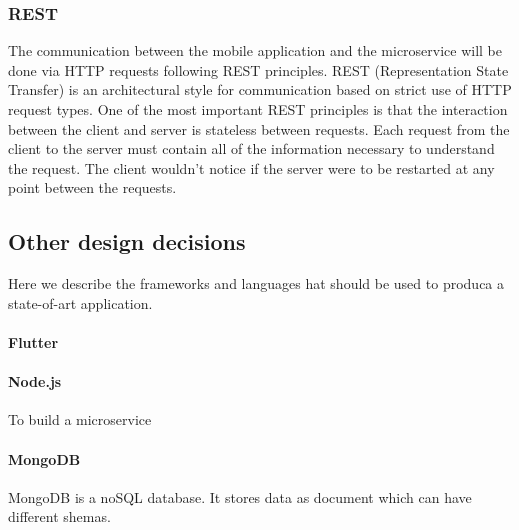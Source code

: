 \subsubsection{REST}

The communication between the mobile application and the microservice will be done via HTTP requests following REST principles. REST (Representation State Transfer) is an architectural style for communication based on strict use of HTTP request types. One of the most important REST principles is that the interaction between the client and server is stateless between requests. Each request from the client to the server must contain all of the information necessary to understand the request. The client wouldn’t notice if the server were to be restarted at any point between the requests.


\subsection{Other design decisions}
Here we describe the frameworks and languages hat should be used to produca a state-of-art application.

\paragraph{Flutter}


\paragraph{Node.js}
To build a microservice

\paragraph{MongoDB}
MongoDB is a noSQL database. It stores data as document which can have different shemas.
